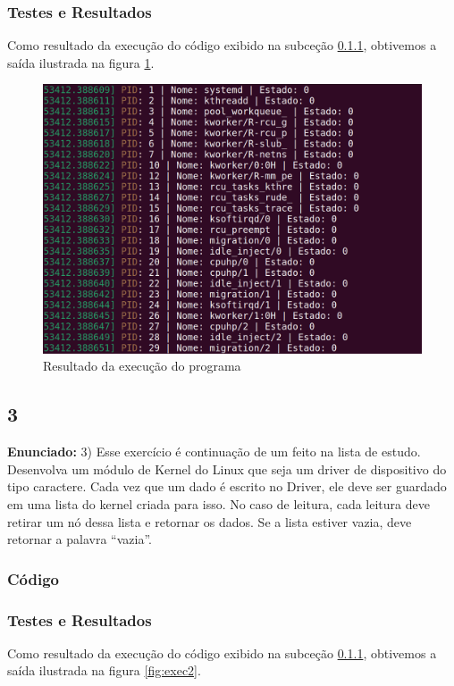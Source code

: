 \documentclass{article}
\begin{document}
\subsubsection{Testes e Resultados}
Como resultado da execução do código exibido na subceção \ref{sub-sec-cod1}, obtivemos a saída ilustrada na figura \ref{fig:exec1}. 

\begin{figure}[ht]
    \centering
    \includegraphics[width=1\textwidth]{./Images/saida1.png}
    \caption{Resultado da execução do programa}
    \label{fig:exec1}
\end{figure}


\subsection{3}

\textbf{Enunciado:} 3) Esse exercício é continuação de um feito na lista de estudo. Desenvolva um módulo de Kernel do Linux que seja um driver de dispositivo do tipo caractere. Cada vez que um dado é escrito no Driver, ele deve ser guardado em uma lista do kernel criada para isso. No caso
de leitura, cada leitura deve retirar um nó dessa lista e retornar os dados. Se a lista estiver vazia, deve retornar a palavra “vazia”.\newline

\subsubsection{Código}
\label{sub-sec-cod1}


\subsubsection{Testes e Resultados}
Como resultado da execução do código exibido na subceção \ref{sub-sec-cod1}, obtivemos a saída ilustrada na figura \ref{fig:exec2}. 
\end{document}
